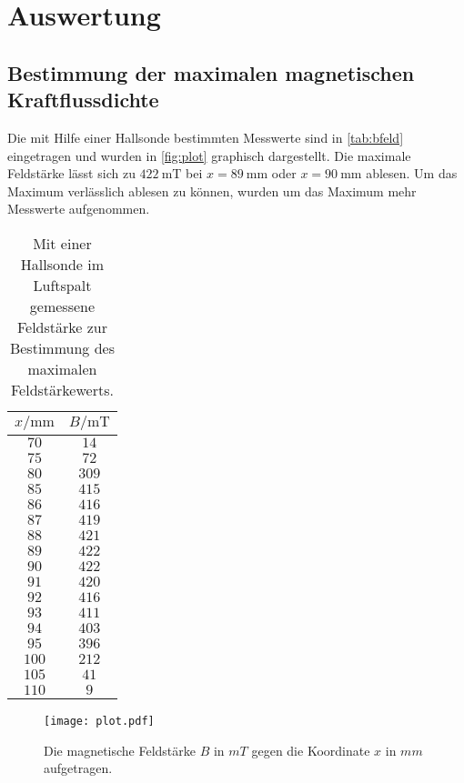 \section{Auswertung}
\label{sec:Auswertung}

\subsection{Bestimmung der maximalen magnetischen Kraftflussdichte}
Die mit Hilfe einer Hallsonde bestimmten Messwerte sind in \autoref{tab:bfeld} eingetragen und wurden in
\autoref{fig:plot} graphisch dargestellt. Die maximale Feldstärke lässt sich zu $\SI{422}{\milli\tesla}$
bei $x=\SI{89}{\milli\meter}$ oder $x=\SI{90}{\milli\meter}$ ablesen. Um das Maximum verlässlich ablesen
zu können, wurden um das Maximum mehr Messwerte aufgenommen.

\begin{table}[hbt!]
  \centering
  \caption{Mit einer Hallsonde im Luftspalt gemessene Feldstärke zur Bestimmung des maximalen Feldstärkewerts.}
  \label{tab:bfeld}
  \begin{tabular}{c c}
    \toprule
    $x/\si{\milli\meter}$ & $B/\si{\milli\tesla}$\\
    \midrule
    $ 70$ & $ 14$ \\
    $ 75$ & $ 72$ \\
    $ 80$ & $309$ \\
    $ 85$ & $415$ \\
    $ 86$ & $416$ \\
    $ 87$ & $419$ \\
    $ 88$ & $421$ \\
    $ 89$ & $422$ \\
    $ 90$ & $422$ \\
    $ 91$ & $420$ \\
    $ 92$ & $416$ \\
    $ 93$ & $411$ \\
    $ 94$ & $403$ \\
    $ 95$ & $396$ \\
    $100$ & $212$ \\
    $105$ & $ 41$ \\
    $110$ & $  9$ \\
    \bottomrule
  \end{tabular}
\end{table}

\begin{figure}[hbt!]
  \centering
  \texttt{[image: plot.pdf]}
  \caption{Die magnetische Feldstärke $B$ in $mT$ gegen die Koordinate $x$ in $mm$ aufgetragen.}
  \label{fig:plot}
\end{figure}

